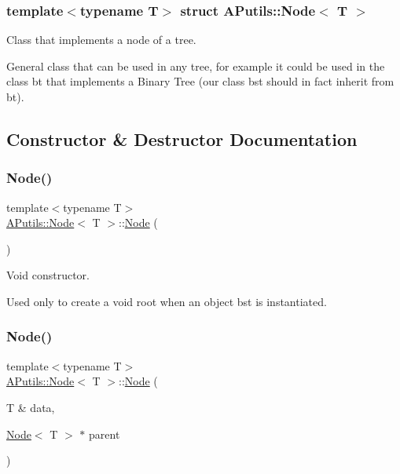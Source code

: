 \subsubsection*{template$<$typename T$>$\newline
struct A\+Putils\+::\+Node$<$ T $>$}

Class that implements a node of a tree. 

General class that can be used in any tree, for example it could be used in the class bt that implements a Binary Tree (our class {\ttfamily bst} should in fact inherit from bt). 

\subsection{Constructor \& Destructor Documentation}
\mbox{\label{struct_a_putils_1_1_node_a545892e6abb32d0c21c0f599cea87aa3}} 
\subsubsection{\texorpdfstring{Node()}{Node()}\hspace{0.1cm}{\footnotesize\ttfamily [1/3]}}
{\footnotesize\ttfamily template$<$typename T$>$ \\
\hyperlink{struct_a_putils_1_1_node}{A\+Putils\+::\+Node}$<$ T $>$\+::\hyperlink{struct_a_putils_1_1_node}{Node} (\begin{DoxyParamCaption}{ }\end{DoxyParamCaption})\hspace{0.3cm}{\ttfamily [inline]}}



Void constructor. 

Used only to create a void root when an object {\ttfamily bst} is instantiated. \mbox{\label{struct_a_putils_1_1_node_ae7dcf8a32c03fcf4424def1db9dc9901}} 
\subsubsection{\texorpdfstring{Node()}{Node()}\hspace{0.1cm}{\footnotesize\ttfamily [2/3]}}
{\footnotesize\ttfamily template$<$typename T$>$ \\
\hyperlink{struct_a_putils_1_1_node}{A\+Putils\+::\+Node}$<$ T $>$\+::\hyperlink{struct_a_putils_1_1_node}{Node} (\begin{DoxyParamCaption}\item[{T \&}]{data,  }\item[{\hyperlink{struct_a_putils_1_1_node}{Node}$<$ T $>$ $\ast$}]{parent }\end{DoxyParamCaption})\hspace{0.3cm}{\ttfamily [inline]}}



